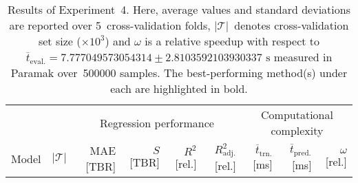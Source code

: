 \begin{table*}
	\centering
	\caption{\label{tbl:exp4-detailed-results}Results of Experiment~4. Here,
		average values and standard deviations are reported over 5~cross-validation folds,
		$|\mathcal{T}|$~denotes cross-validation set size ($\times 10^3$)
		and $\omega$ is a relative speedup with respect to
		$\overline{t}_{\text{eval.}}=\num{7.777049573054314} \pm
		\num{2.8103592103930337} \text{ s}$
		measured in Paramak over~\num{500000} samples.
	The best-performing method(s) under each are highlighted in bold.}
	\setlength\tabcolsep{4pt}
	\renewcommand{\arraystretch}{0.95}
	\begin{indented}
	\item[]
		\scriptsize
		\begin{tabular}{lrrrrrrrr}
		\toprule
		{} & {} & \multicolumn{4}{c}{Regression performance} &
		\multicolumn{3}{c}{Computational complexity}\\
		\cmidrule(lr){3-6}
		\cmidrule(lr){7-9}
		Model & $|\mathcal{T}|$ & MAE [TBR] & $S$ [TBR] & $R^2$ [rel.] & $R^2_{\text{adj.}}$ [rel.]
						& $\overline{t}_{\text{trn.}}$ [\si{\milli\second}] &
		$\overline{t}_{\text{pred.}}$ [\si{\milli\second}] & $\omega$ [rel.]\\
		\midrule
		
		\bottomrule
		\end{tabular}
	\end{indented}
\end{table*}

